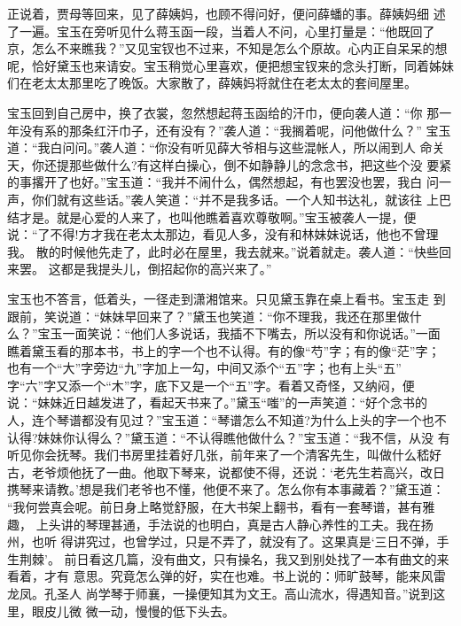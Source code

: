 正说着，贾母等回来，见了薛姨妈，也顾不得问好，便问薛蟠的事。薛姨妈细
述了一遍。宝玉在旁听见什么蒋玉函一段，当着人不问，心里打量是：“他既回了
京，怎么不来瞧我？”又见宝钗也不过来，不知是怎么个原故。心内正自呆呆的想
呢，恰好黛玉也来请安。宝玉稍觉心里喜欢，便把想宝钗来的念头打断，同着姊妹
们在老太太那里吃了晚饭。大家散了，薛姨妈将就住在老太太的套间屋里。

宝玉回到自己房中，换了衣裳，忽然想起蒋玉函给的汗巾，便向袭人道：“你
那一年没有系的那条红汗巾子，还有没有？”袭人道：“我搁着呢，问他做什么？”
宝玉道：“我白问问。”袭人道：“你没有听见薛大爷相与这些混帐人，所以闹到人
命关天，你还提那些做什么?有这样白操心，倒不如静静儿的念念书，把这些个没
要紧的事撂开了也好。”宝玉道：“我并不闹什么，偶然想起，有也罢没也罢，我白
问一声，你们就有这些话。”袭人笑道：“并不是我多话。一个人知书达礼，就该往
上巴结才是。就是心爱的人来了，也叫他瞧着喜欢尊敬啊。”宝玉被袭人一提，便
说：“了不得!方才我在老太太那边，看见人多，没有和林妹妹说话，他也不曾理我。
散的时候他先走了，此时必在屋里，我去就来。”说着就走。袭人道：“快些回来罢。
这都是我提头儿，倒招起你的高兴来了。”

宝玉也不答言，低着头，一径走到潇湘馆来。只见黛玉靠在桌上看书。宝玉走
到跟前，笑说道：“妹妹早回来了？”黛玉也笑道：“你不理我，我还在那里做什
么？”宝玉一面笑说：“他们人多说话，我插不下嘴去，所以没有和你说话。”一面
瞧着黛玉看的那本书，书上的字一个也不认得。有的像“芍”字；有的像“茫”字；
也有一个“大”字旁边“九”字加上一勾，中间又添个“五”字；也有上头“五”
字“六”字又添一个“木”字，底下又是一个“五”字。看着又奇怪，又纳闷，便
说：“妹妹近日越发进了，看起天书来了。”黛玉“嗤”的一声笑道：“好个念书的
人，连个琴谱都没有见过？”宝玉道：“琴谱怎么不知道?为什么上头的字一个也不
认得?妹妹你认得么？”黛玉道：“不认得瞧他做什么？”宝玉道：“我不信，从没
有听见你会抚琴。我们书房里挂着好几张，前年来了一个清客先生，叫做什么嵇好
古，老爷烦他抚了一曲。他取下琴来，说都使不得，还说：‘老先生若高兴，改日
携琴来请教。’想是我们老爷也不懂，他便不来了。怎么你有本事藏着？”黛玉道：
“我何尝真会呢。前日身上略觉舒服，在大书架上翻书，看有一套琴谱，甚有雅趣，
上头讲的琴理甚通，手法说的也明白，真是古人静心养性的工夫。我在扬州，也听
得讲究过，也曾学过，只是不弄了，就没有了。这果真是‘三日不弹，手生荆棘’。
前日看这几篇，没有曲文，只有操名，我又到别处找了一本有曲文的来看着，才有
意思。究竟怎么弹的好，实在也难。书上说的：师旷鼓琴，能来风雷龙凤。孔圣人
尚学琴于师襄，一操便知其为文王。高山流水，得遇知音。”说到这里，眼皮儿微
微一动，慢慢的低下头去。

